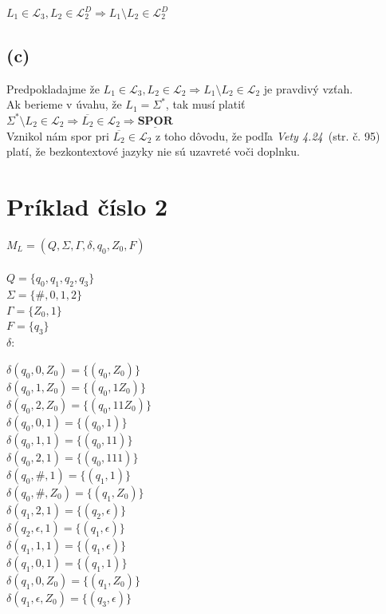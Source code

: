 \documentclass[11pt,a4paper]{article}
\begin{document}
\begin{center}
$L_1 \in \mathcal{L}_3, L_2 \in \mathcal{L}_2^D \Rightarrow L_1 \setminus L_2 \in \mathcal{L}_2^D$
\end{center}


\subsection{(c)} %


Predpokladajme že $L_1 \in \mathcal{L}_3, L_2 \in \mathcal{L}_2 \Rightarrow L_1 \setminus L_2 \in \mathcal{L}_2$ je pravdivý vzťah.\\

Ak berieme v úvahu, že $L_1 = \Sigma^*$, tak musí platiť $\Sigma^* \setminus L_2 \in \mathcal{L}_2 \Rightarrow \overline{L_2} \in \mathcal{L}_2 \Rightarrow \underline{\textbf{SPOR}}$\\

Vznikol nám spor pri $\overline{L_2} \in \mathcal{L}_2$ z toho dôvodu, že podľa \textit{Vety 4.24}~\cite{TIN}(str. č. 95) platí, že bezkontextové jazyky nie sú uzavreté voči doplnku.

\newpage
\section{Príklad číslo 2} %

$M_L = (Q,\Sigma,\Gamma,\delta,q_0,Z_0,F)$\\
\\
$Q = \{q_0,q_1,q_2,q_3\}$\\
$\Sigma = \{\#,0,1,2\}$\\
$\Gamma = \{Z_0,1\}$\\
$F = \{q_3\}$\\
$\delta$:\\[-2.9em]
\begin{center}
\begin{minipage}{0.9\textwidth}
$\delta(q_0,0,Z_0)=\{(q_0,Z_0)\}$\\
$\delta(q_0,1,Z_0)=\{(q_0,1Z_0)\}$\\
$\delta(q_0,2,Z_0)=\{(q_0,11Z_0)\}$\\
$\delta(q_0,0,1)=\{(q_0,1)\}$\\
$\delta(q_0,1,1)=\{(q_0,11)\}$\\
$\delta(q_0,2,1)=\{(q_0,111)\}$\\
$\delta(q_0,\#,1)=\{(q_1,1)\}$\\
$\delta(q_0,\#,Z_0)=\{(q_1,Z_0)\}$\\
$\delta(q_1,2,1)=\{(q_2,\epsilon)\}$\\
$\delta(q_2,\epsilon,1)=\{(q_1,\epsilon)\}$\\
$\delta(q_1,1,1)=\{(q_1,\epsilon)\}$\\
$\delta(q_1,0,1)=\{(q_1,1)\}$\\
$\delta(q_1,0,Z_0)=\{(q_1,Z_0)\}$\\
$\delta(q_1,\epsilon,Z_0)=\{(q_3,\epsilon)\}$\\
\end{minipage}
\end{center}
\end{document}
